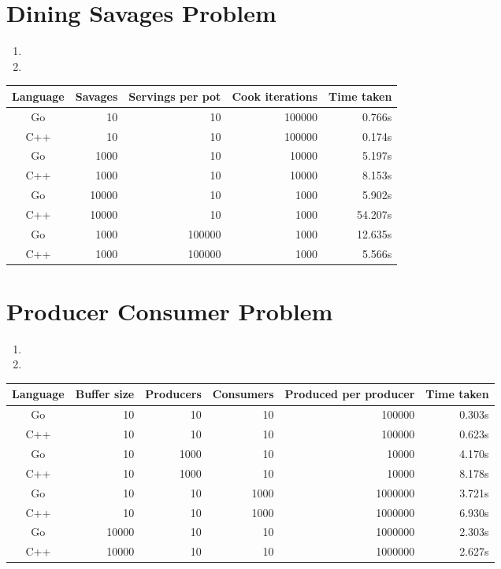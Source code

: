 \documentclass[11pt]{article}
\begin{document}
\section{Dining Savages Problem}
\begin{enumerate}
	\item
	\item
\end{enumerate}

\begin{tabular}{c r r r r}
Language    & Savages & Servings per pot & Cook iterations & Time taken \\
\toprule
Go 			& 10 & 10 & 100000 & 0.766s \\
C++         & 10 & 10 & 100000 & 0.174s \\
\cmidrule{1-5}
Go 			& 1000 & 10 & 10000 & 5.197s \\
C++         & 1000 & 10 & 10000 & 8.153s \\
\cmidrule{1-5}
Go 			& 10000 & 10 & 1000 & 5.902s \\
C++         & 10000 & 10 & 1000 & 54.207s \\
\cmidrule{1-5}
Go 			& 1000 & 100000 & 1000 & 12.635s \\
C++         & 1000 & 100000 & 1000 & 5.566s \\
\end{tabular}

\section{Producer Consumer Problem}
\begin{enumerate}
	\item
	\item
\end{enumerate}

\begin{tabular}{c r r r r r}
Language    & Buffer size & Producers & Consumers & Produced per producer & Time taken \\
\toprule
Go 			& 10 & 10 & 10 & 100000 & 0.303s \\
C++         & 10 & 10 & 10 & 100000 & 0.623s \\
\cmidrule{1-6}
Go 			& 10 & 1000 & 10 & 10000 & 4.170s \\
C++         & 10 & 1000 & 10 & 10000 & 8.178s \\
\cmidrule{1-6}
Go 			& 10 & 10 & 1000 & 1000000 & 3.721s \\
C++         & 10 & 10 & 1000 & 1000000 & 6.930s \\
\cmidrule{1-6}
Go 			& 10000 & 10 & 10 & 1000000 & 2.303s \\
C++         & 10000 & 10 & 10 & 1000000 & 2.627s \\
\end{tabular}
\end{document}
